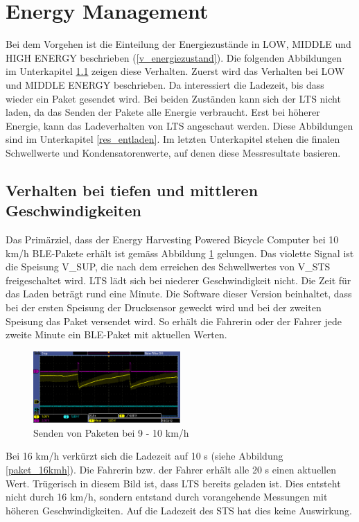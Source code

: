 \section{Energy Management}

Bei dem Vorgehen ist die Einteilung der Energiezustände in LOW, MIDDLE und HIGH ENERGY beschrieben (\ref{v_energiezustand}). Die folgenden Abbildungen im Unterkapitel \ref{tiefes_v} zeigen diese Verhalten. Zuerst wird das Verhalten bei LOW und MIDDLE ENERGY beschrieben. Da interessiert die Ladezeit, bis dass wieder ein Paket gesendet wird. Bei beiden Zuständen kann sich der LTS nicht laden, da das Senden der Pakete alle Energie verbraucht. Erst bei höherer Energie, kann das Ladeverhalten von LTS angeschaut werden. Diese Abbildungen sind im Unterkapitel \ref{res_entladen}. Im letzten Unterkapitel stehen die finalen Schwellwerte und Kondensatorenwerte, auf denen diese Messresultate basieren.

\subsection{Verhalten bei tiefen und mittleren Geschwindigkeiten}
\label{tiefes_v}


Das Primärziel, dass der Energy Harvesting Powered Bicycle Computer bei 10 km/h BLE-Pakete erhält ist gemäss Abbildung \ref{paket_100kmh} gelungen. Das violette Signal ist die Speisung V\_SUP, die nach dem erreichen des Schwellwertes von V\_STS freigeschaltet wird. LTS lädt sich bei niederer Geschwindigkeit nicht. Die Zeit für das Laden beträgt rund eine Minute. Die Software dieser Version beinhaltet, dass bei der ersten Speisung der Drucksensor geweckt wird  und bei der zweiten Speisung das Paket versendet wird. So erhält die Fahrerin oder der Fahrer jede zweite Minute ein BLE-Paket mit aktuellen Werten.

\begin{figure}[ht]
   \includegraphics[width=0.5\textwidth]{4Resultate/imag/pic_3.PNG}
    \caption{Senden von Paketen bei 9 - 10 km/h}
    \label{paket_100kmh}
\end{figure}

Bei 16 km/h verkürzt sich die Ladezeit auf 10 s (siehe Abbildung \ref{paket_16kmh}). Die Fahrerin bzw. der Fahrer erhält alle 20 s einen aktuellen Wert. Trügerisch in diesem Bild ist, dass LTS bereits geladen ist. Dies entsteht nicht durch 16 km/h, sondern entstand durch vorangehende Messungen mit höheren Geschwindigkeiten. Auf die Ladezeit des STS hat dies keine Auswirkung.


